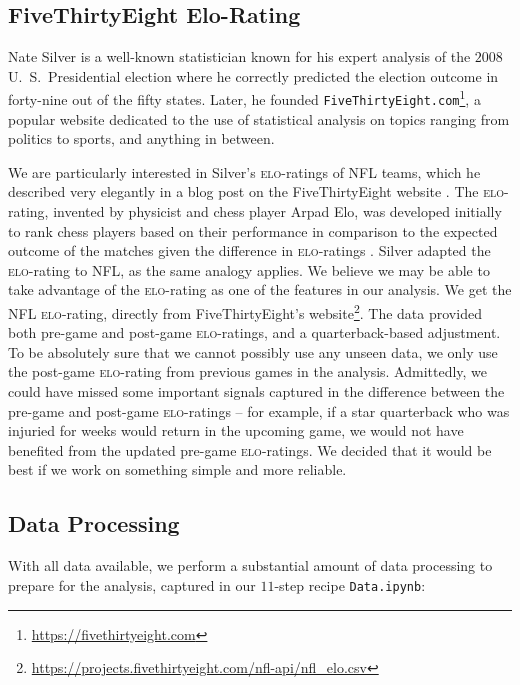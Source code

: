 \documentclass[10pt]{article}
\begin{document}
\subsection{FiveThirtyEight Elo-Rating}

Nate Silver is a well-known statistician known for his expert analysis of the
$2008$ U.~S.~Presidential election where he correctly predicted the election outcome in
forty-nine out of the fifty states. Later, he founded
\texttt{FiveThirtyEight.com}\footnote{\url{https://fivethirtyeight.com}},
a popular website dedicated to the
use of statistical analysis on topics ranging from politics to sports, and anything in between.

We are particularly interested in Silver's \textsc{elo}-ratings of NFL teams, which he 
described very elegantly in a blog post
on the FiveThirtyEight website \cite{Silv2018}. The \textsc{elo}-rating, invented by
physicist and chess player Arpad Elo, was developed initially to rank chess players based
on their performance in comparison to the expected outcome of the matches given the
difference in \textsc{elo}-ratings \cite{elo1978rating}.
Silver adapted the \textsc{elo}-rating to NFL, as the same
analogy applies.
We believe we may be able to take advantage of the \textsc{elo}-rating
as one of the features in our analysis. We get the NFL \textsc{elo}-rating, directly from 
FiveThirtyEight's website\footnote{
\url{https://projects.fivethirtyeight.com/nfl-api/nfl_elo.csv}}. The data provided both
pre-game and post-game \textsc{elo}-ratings, and a quarterback-based adjustment. To be absolutely sure
that we cannot possibly use any unseen data, we only use the post-game \textsc{elo}-rating from
previous games in the analysis. Admittedly, we could have missed some important
signals captured in the difference between the pre-game and post-game \textsc{elo}-ratings -- for
example, if a star quarterback who was injuried for weeks would return in the upcoming game,
we would not have benefited from the updated pre-game \textsc{elo}-ratings. We decided that it would
be best if we work on something simple and more reliable.

\subsection{Data Processing}

With all data available, we perform a substantial amount of data processing to prepare for
the analysis, captured in our $11$-step recipe \texttt{Data.ipynb}:
\end{document}
